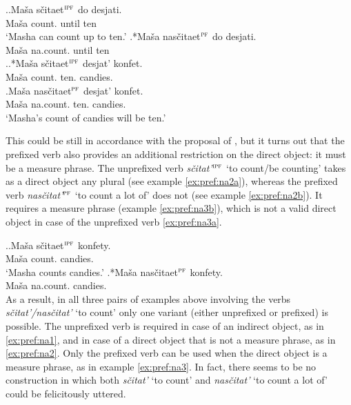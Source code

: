 \ex.\label{ex:pref:na1}\ag.\label{ex:pref:na1a}Ma\v{s}a s\v{c}itaet$^{\textsc{ipf}}$ do desjati.\\
Ma\v{s}a count. until ten\\
\trans `Masha can count up to ten.'
\bg.*Ma\v{s}a nas\v{c}itaet$^{\textsc{pf}}$ do desjati.\label{ex:pref:na1b}\\
Ma\v{s}a na.count. until ten\\

\ex.\label{ex:pref:na2}\ag.*Ma\v{s}a s\v{c}itaet$^{\textsc{ipf}}$ desjat' konfet.\label{ex:pref:na2a}\\
Ma\v{s}a count. ten. candies.\\
\bg.\label{ex:pref:na2b}Ma\v{s}a nas\v{c}itaet$^{\textsc{pf}}$ desjat' konfet.\\
Ma\v{s}a na.count. ten. candies.\\
\trans `Masha's count of candies will be ten.'

This could be still in accordance with the proposal of \citet{Tatevosov:09}, but it turns out that the prefixed verb also provides an additional restriction on the direct object: it must be a measure phrase. The unprefixed verb \textit{s\v{c}itat'}$^{\textsc{ipf}}$ `to count\slash be counting' takes as a direct object any plural  (see example \ref{ex:pref:na2a}), whereas the prefixed verb \textit{nas\v{c}itat'}$^{\textsc{pf}}$ `to count a lot of' does not (see example \ref{ex:pref:na2b}). It requires a measure phrase (example \ref{ex:pref:na3b}), which is not a valid direct object in case of the unprefixed verb \ref{ex:pref:na3a}. 

\ex.\label{ex:pref:na3}\ag.\label{ex:pref:na3a}Ma\v{s}a s\v{c}itaet$^{\textsc{ipf}}$ konfety.\\
Ma\v{s}a count. candies.\\
\trans `Masha counts candies.'
\bg.*Ma\v{s}a nas\v{c}itaet$^{\textsc{pf}}$ konfety.\label{ex:pref:na3b}\\
Ma\v{s}a na.count. candies.\\

As a result, in all three pairs of examples above involving the verbs \textit{s\v{c}itat'/nas\v{c}itat'} `to count' only one variant (either unprefixed or prefixed) is possible. The unprefixed verb is required in case of an indirect object, as in \ref{ex:pref:na1}, and in case of a direct object that is not a measure phrase, as in \ref{ex:pref:na2}. Only the prefixed verb can be used when the direct object is a measure phrase, as in example \ref{ex:pref:na3}. In fact, there seems to be no construction in which both \textit{s\v{c}itat'} `to count' and \textit{nas\v{c}itat'} `to count a lot of' could be felicitously uttered.

